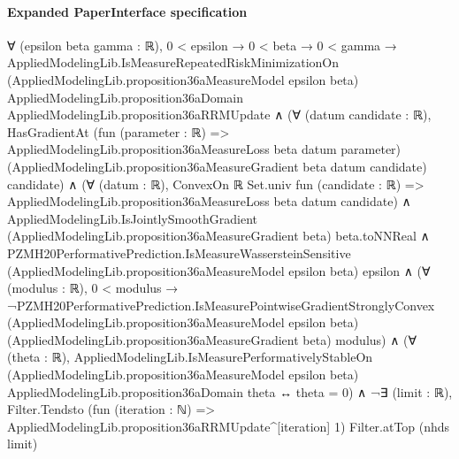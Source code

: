 \documentclass[10pt]{article}
\begin{document}
\paragraph{Expanded PaperInterface specification}
\begin{ReviewVerbatim}
∀ (epsilon beta gamma : ℝ),
  0 < epsilon →
    0 < beta →
      0 < gamma →
        AppliedModelingLib.IsMeasureRepeatedRiskMinimizationOn
            (AppliedModelingLib.proposition36aMeasureModel epsilon beta) AppliedModelingLib.proposition36aDomain
            AppliedModelingLib.proposition36aRRMUpdate ∧
          (∀ (datum candidate : ℝ),
              HasGradientAt (fun (parameter : ℝ) => AppliedModelingLib.proposition36aMeasureLoss beta datum parameter)
                (AppliedModelingLib.proposition36aMeasureGradient beta datum candidate) candidate) ∧
            (∀ (datum : ℝ),
                ConvexOn ℝ Set.univ fun (candidate : ℝ) =>
                  AppliedModelingLib.proposition36aMeasureLoss beta datum candidate) ∧
              AppliedModelingLib.IsJointlySmoothGradient (AppliedModelingLib.proposition36aMeasureGradient beta)
                  beta.toNNReal ∧
                PZMH20PerformativePrediction.IsMeasureWassersteinSensitive
                    (AppliedModelingLib.proposition36aMeasureModel epsilon beta) epsilon ∧
                  (∀ (modulus : ℝ),
                      0 < modulus →
                        ¬PZMH20PerformativePrediction.IsMeasurePointwiseGradientStronglyConvex
                            (AppliedModelingLib.proposition36aMeasureModel epsilon beta)
                            (AppliedModelingLib.proposition36aMeasureGradient beta) modulus) ∧
                    (∀ (theta : ℝ),
                        AppliedModelingLib.IsMeasurePerformativelyStableOn
                            (AppliedModelingLib.proposition36aMeasureModel epsilon beta)
                            AppliedModelingLib.proposition36aDomain theta ↔
                          theta = 0) ∧
                      ¬∃ (limit : ℝ),
                          Filter.Tendsto
                            (fun (iteration : ℕ) => AppliedModelingLib.proposition36aRRMUpdate^[iteration] 1)
                            Filter.atTop (nhds limit)
\end{ReviewVerbatim}
\end{document}
